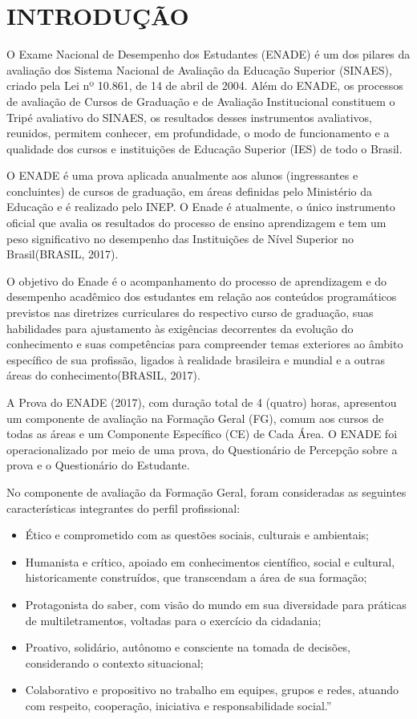 \documentclass[12pt]{article}
\begin{document}
\section{INTRODUÇÃO}

O Exame Nacional de Desempenho dos Estudantes (ENADE) é um dos pilares da avaliação dos Sistema Nacional de Avaliação da Educação Superior (SINAES), criado pela Lei nº 10.861, de 14 de abril de 2004. Além do ENADE, os processos de avaliação de Cursos de Graduação e de Avaliação Institucional constituem o Tripé avaliativo do SINAES, os resultados desses instrumentos avaliativos, reunidos, permitem conhecer, em profundidade, o modo de funcionamento e a qualidade dos cursos e instituições de Educação Superior (IES) de todo o Brasil.

O ENADE é uma prova aplicada anualmente aos alunos (ingressantes e concluintes) de cursos de graduação, em áreas definidas pelo Ministério da Educação e é realizado pelo INEP. O Enade é atualmente, o único instrumento oficial que avalia os resultados do processo de ensino aprendizagem e tem um peso significativo no desempenho das Instituições de Nível Superior no Brasil(BRASIL, 2017).

O objetivo do Enade é o acompanhamento do processo de aprendizagem e do desempenho acadêmico dos estudantes em relação aos conteúdos programáticos previstos nas diretrizes curriculares do respectivo curso de graduação, suas habilidades para ajustamento às exigências decorrentes da evolução do conhecimento e suas competências para compreender temas exteriores ao âmbito específico de sua profissão, ligados à realidade brasileira e mundial e a outras áreas do conhecimento(BRASIL, 2017).


A Prova do ENADE (2017), com duração total de 4 (quatro) horas, apresentou um componente de avaliação na Formação Geral (FG), comum aos cursos de todas as áreas e um Componente Específico (CE) de Cada Área. O ENADE foi operacionalizado por meio de uma prova, do Questionário de Percepção sobre a prova e o Questionário do Estudante.


No componente de avaliação da Formação Geral, foram consideradas as seguintes características integrantes do perfil profissional:


\begin{itemize}
    \item Ético e comprometido com as questões sociais, culturais e ambientais;
    \item Humanista e crítico, apoiado em conhecimentos científico, social e cultural, historicamente construídos, que transcendam a área de sua formação; 
    \item Protagonista do saber, com visão do mundo em sua diversidade para práticas de multiletramentos, voltadas para o exercício da cidadania;
    \item Proativo, solidário, autônomo e consciente na tomada de decisões, considerando o contexto situacional;
    \item Colaborativo e propositivo no trabalho em equipes, grupos e redes, atuando com respeito, cooperação, iniciativa e responsabilidade social.”
\end{itemize}
	 
\end{document}
